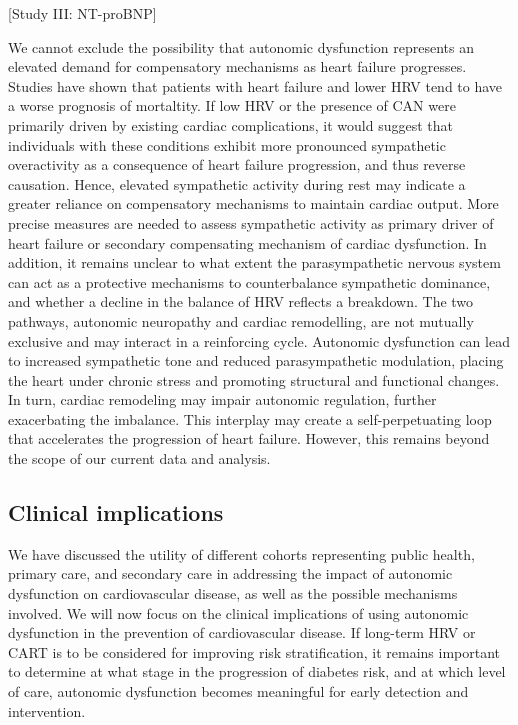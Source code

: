 \documentclass[
  a4paper,
  headsepline=true,
  open=any]{scrbook}
\begin{document}
{[}Study III: NT-proBNP{]}

We cannot exclude the possibility that autonomic dysfunction represents
an elevated demand for compensatory mechanisms as heart failure
progresses. Studies have shown that patients with heart failure and
lower HRV tend to have a worse prognosis of mortaltity. If low HRV or
the presence of CAN were primarily driven by existing cardiac
complications, it would suggest that individuals with these conditions
exhibit more pronounced sympathetic overactivity as a consequence of
heart failure progression, and thus reverse causation. Hence, elevated
sympathetic activity during rest may indicate a greater reliance on
compensatory mechanisms to maintain cardiac output. More precise
measures are needed to assess sympathetic activity as primary driver of
heart failure or secondary compensating mechanism of cardiac
dysfunction. In addition, it remains unclear to what extent the
parasympathetic nervous system can act as a protective mechanisms to
counterbalance sympathetic dominance, and whether a decline in the
balance of HRV reflects a breakdown. The two pathways, autonomic
neuropathy and cardiac remodelling, are not mutually exclusive and may
interact in a reinforcing cycle. Autonomic dysfunction can lead to
increased sympathetic tone and reduced parasympathetic modulation,
placing the heart under chronic stress and promoting structural and
functional changes. In turn, cardiac remodeling may impair autonomic
regulation, further exacerbating the imbalance. This interplay may
create a self-perpetuating loop that accelerates the progression of
heart failure. However, this remains beyond the scope of our current
data and analysis.

\hypertarget{clinical-implications}{%
\subsection{Clinical implications}\label{clinical-implications}}

We have discussed the utility of different cohorts representing public
health, primary care, and secondary care in addressing the impact of
autonomic dysfunction on cardiovascular disease, as well as the possible
mechanisms involved. We will now focus on the clinical implications of
using autonomic dysfunction in the prevention of cardiovascular disease.
If long-term HRV or CART is to be considered for improving risk
stratification, it remains important to determine at what stage in the
progression of diabetes risk, and at which level of care, autonomic
dysfunction becomes meaningful for early detection and intervention.
\end{document}
